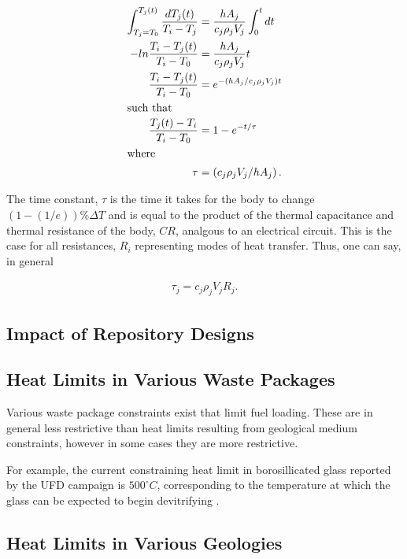 {\begin{align*}
  \int_{T_j=T_0}^{T_j(t)} 
  \frac{dT_j(t)}{T_i-T_j}&=\frac{hA_j}{c_j\rho_jV_j}\int_0^t dt\\
  -ln\frac{T_i-T_j(t)}{T_i-T_0}&=\frac{hA_j}{c_j\rho_jV_j}t\\
  \frac{T_i-T_j(t)}{T_i-T_0}&= e^{-(hA_j/c_j\rho_jV_j)t}\\
  \intertext{such that}
  \frac{T_j(t)-T_i}{T_i-T_0}&= 1- e^{-t/\tau}\\
  \intertext{where}
  \tau &= \left( c_j\rho_jV_j/hA_j \right).
\end{align*}

The time constant, $\tau$ is the time it takes for the body to change 
$(1-(1/e))\%\Delta T$ and is equal to the product of the thermal capacitance and 
thermal resistance of the body, $CR$, analgous to an electrical circuit.
\cite{el-wakil_nuclear_1981} This is the case for all resistances, $R_i$ 
representing modes of heat transfer. Thus, one can say, in general

\begin{align*}
  \tau_j = c_j \rho_j V_j R_j.
\end{align*}

\subsection{Impact of Repository Designs}

\subsection{Heat Limits in Various Waste Packages} 

Various waste package constraints exist that limit fuel loading. These are 
in general less restrictive than heat limits resulting from geological medium 
constraints, however in some cases they are more restrictive. 

For example, the current constraining heat limit in borosillicated glass 
reported by the \gls{UFD} campaign is $500^{\circ}C$, corresponding to the 
temperature at which the glass can be expected to begin devitrifying 
\cite{carter_2010, hardin_generic_2011, soelberg_heat_2009}.

\subsection{Heat Limits in Various Geologies}



}
